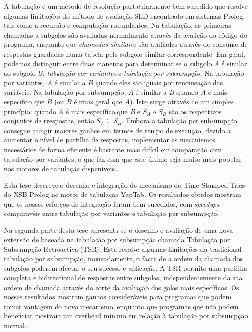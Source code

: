 A tabulação é um método de resolução particularmente bem sucedido que resolve algumas limitações
do método de avaliação SLD encontrado em sistemas Prolog, tais como a recursão e computação redundantes.
Na tabulação, as primeiras chamadas a subgolos são avaliadas normalmente através da avalição do código do
programa, enquanto que \emph{chamadas similares} são avaliadas através do consumo de respostas guardadas
numa tabela pelo subgolo similar correspondente.
Em geral, podemos distinguir entre duas maneiras para determinar se o subgolo $A$ é similar ao subgolo $B$:
\emph{tabulação por variantes} e \emph{tabulação por subsumpção}.
Na tabulação por variantes, $A$ é similar a $B$ quando eles são iguais por renomeação das variáveis.
Na tabulação por subsumpção, $A$ é similar a $B$ quando $A$ é mais específico que $B$ (ou $B$ é mais geral que $A$).
Isto surge através de um simples princípio: quando $A$ é mais específico que $B$ e $S_A$ e $S_B$ são os respectivos
conjuntos de rrespostas, então $S_A \subseteq S_B$.
Embora a tabulação por subsumpção consegue atingir maiores ganhos em termos de tempo de execução, devido
a aumentar o nível de partilha de respostas, implementar os mecanismos necessários de forma eficiente é bastante
mais difícil em comparação com tabulação por variantes, o que faz com que este último seja muito mais popular
nos motores de tabulação disponíveis.

Esta tese descreve o desenho e integração do mecanismo do Time-Stamped Tries do XSB Prolog no motor de tabulação
YapTab. Os resultados obtidos mostram que os nossos esforços de integração foram bem sucedidos, com \emph{speedups}
comparavéis entre tabulação por variantes e tabulação por subsumpção.

Na segunda parte desta tese apresenta-se o desenho e avaliação de uma nova extensão de baseada na tabulação
por subsumpção chamada Tabulação por Subsumpção Retroactiva (TSR). Esta resolve algumas limitações da tradicional
tabulação por subsumpção, nomeadamente, o facto de a ordem da chamada dos subgolos poderem afectar o seu sucesso e
aplicação. A TSR permite uma partilha completa e bidireccional de respostas entre subgolos, independentemente da
sua ordem de chamada através do corte da avaliação dos golos mais específicos.
Os nossos resultados mostram ganhos consideráveis para programas que podem tomar vantagem do novo mecanismo,
enquanto que programas que não podem beneficiar mostram um overhead mínimo em relação à tabulação por subsumpção
normal.